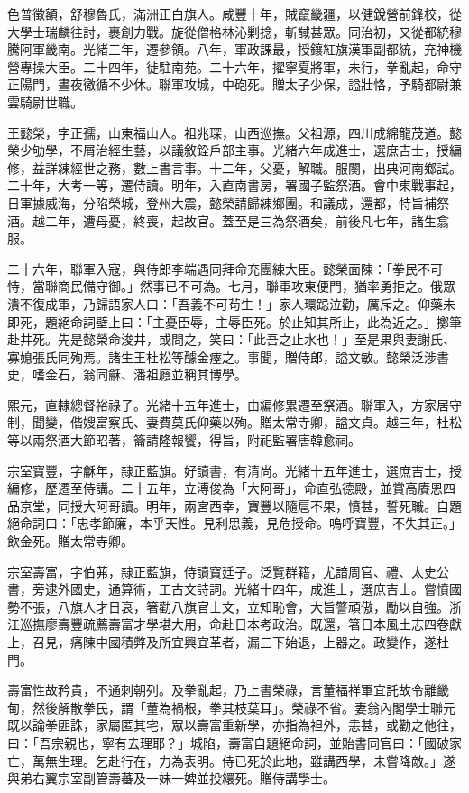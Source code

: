 \begin{pinyinscope}
色普徵額，舒穆魯氏，滿洲正白旗人。咸豐十年，賊竄畿疆，以健銳營前鋒校，從大學士瑞麟往討，裹創力戰。旋從僧格林沁剿捻，斬馘甚眾。同治初，又從都統穆騰阿軍畿南。光緒三年，遷參領。八年，軍政課最，授鑲紅旗漢軍副都統，充神機營專操大臣。二十四年，徙駐南苑。二十六年，擢寧夏將軍，未行，拳亂起，命守正陽門，晝夜徼循不少休。聯軍攻城，中砲死。贈太子少保，謚壯恪，予騎都尉兼雲騎尉世職。

王懿榮，字正孺，山東福山人。祖兆琛，山西巡撫。父祖源，四川成綿龍茂道。懿榮少劬學，不屑治經生藝，以議敘銓戶部主事。光緒六年成進士，選庶吉士，授編修，益詳練經世之務，數上書言事。十二年，父憂，解職。服闋，出典河南鄉試。二十年，大考一等，遷侍讀。明年，入直南書房，署國子監祭酒。會中東戰事起，日軍據威海，分陷榮城，登州大震，懿榮請歸練鄉團。和議成，還都，特旨補祭酒。越二年，遭母憂，終喪，起故官。蓋至是三為祭酒矣，前後凡七年，諸生翕服。

二十六年，聯軍入寇，與侍郎李端遇同拜命充團練大臣。懿榮面陳：「拳民不可恃，當聯商民備守御。」然事已不可為。七月，聯軍攻東便門，猶率勇拒之。俄眾潰不復成軍，乃歸語家人曰：「吾義不可茍生！」家人環跽泣勸，厲斥之。仰藥未即死，題絕命詞壁上曰：「主憂臣辱，主辱臣死。於止知其所止，此為近之。」擲筆赴井死。先是懿榮命浚井，或問之，笑曰：「此吾之止水也！」至是果與妻謝氏、寡媳張氏同殉焉。諸生王杜松等醵金瘞之。事聞，贈侍郎，謚文敏。懿榮泛涉書史，嗜金石，翁同龢、潘祖廕並稱其博學。

熙元，直隸總督裕祿子。光緒十五年進士，由編修累遷至祭酒。聯軍入，方家居守制，聞變，偕嫂富察氏、妻費莫氏仰藥以殉。贈太常寺卿，謚文貞。越三年，杜松等以兩祭酒大節昭著，籥請隆報饗，得旨，附祀監署唐韓愈祠。

宗室寶豐，字龢年，隸正藍旗。好讀書，有清尚。光緒十五年進士，選庶吉士，授編修，歷遷至侍講。二十五年，立溥俊為「大阿哥」，命直弘德殿，並賞高賡恩四品京堂，同授大阿哥讀。明年，兩宮西幸，寶豐以隨扈不果，憤甚，誓死職。自題絕命詞曰：「忠孝節廉，本乎天性。見利思義，見危授命。嗚呼寶豐，不失其正。」飲金死。贈太常寺卿。

宗室壽富，字伯茀，隸正藍旗，侍讀寶廷子。泛覽群籍，尤諳周官、禮、太史公書，旁逮外國史，通算術，工古文詩詞。光緒十四年，成進士，選庶吉士。嘗憤國勢不張，八旗人才日衰，箸勸八旗官士文，立知恥會，大旨警頑傲，勵以自強。浙江巡撫廖壽豐疏薦壽富才學堪大用，命赴日本考政治。既還，箸日本風土志四卷獻上，召見，痛陳中國積弊及所宜興宜革者，漏三下始退，上器之。政變作，遂杜門。

壽富性故矜貴，不通刺朝列。及拳亂起，乃上書榮祿，言董福祥軍宜託故令離畿甸，然後解散拳民，謂「董為禍根，拳其枝葉耳」。榮祿不省。妻翁內閣學士聯元既以論拳匪誅，家屬匿其宅，眾以壽富重新學，亦指為袒外，恚甚，或勸之他往，曰：「吾宗親也，寧有去理耶？」城陷，壽富自題絕命詞，並貽書同官曰：「國破家亡，萬無生理。乞赴行在，力為表明。侍已死於此地，雖講西學，未嘗降敵。」遂與弟右翼宗室副管壽蕃及一妹一婢並投繯死。贈侍講學士。


\end{pinyinscope}
